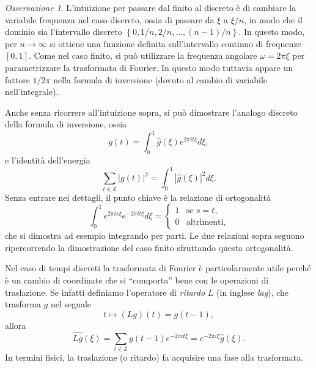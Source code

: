 \documentclass[
  italian,
  letterpaper,
]{book}
\newcommand{\cur}[1]{\left\{ #1 \right\}}
\theoremstyle{definition}
\theoremstyle{remark}
\newtheorem*{remark}{Osservazione}
\begin{document}
\begin{remark}
L'intuizione per passare dal finito al discreto è di cambiare la
variabile frequenza nel caso discreto, ossia di passare da \(\xi\) a
\(\xi/n\), in modo che il dominio sia l'intervallo discreto
\(\cur{0,1/n, 2/n, \ldots, (n-1)/n}\). In questo modo, per
\(n \to \infty\) si ottiene una funzione definita sull'intervallo
continuo di frequenze \([0,1]\). Come nel caso finito, si può utilizzare
la frequenza angolare \(\omega = 2 \pi \xi\) per parametrizzare la
trasformata di Fourier. In questo modo tuttavia appare un fattore
\(1/2\pi\) nella formula di inversione (dovuto al cambio di variabile
nell'integrale).
\end{remark}

Anche senza ricorrere all'intuizione sopra, si può dimostrare l'analogo
discreto della formula di inversione, ossia
\[ g(t) =  \int_0^1 \hat{g}(\xi) e^{2 \pi i t \xi}d \xi,\] e l'identità
dell'energia
\[ \sum_{t \in \mathbb{Z}} |g(t)|^2 =  \int_0^1 |\hat{g}(\xi)|^2 d \xi.\]
Senza entrare nei dettagli, il punto chiave è la relazione di
ortogonalità
\[ \int_0^1 e^{2 \pi i s \xi} e^{-2 \pi i t \xi} d \xi = \begin{cases} 1 & \text{se $s=t$,}
\\
0 & \text{altrimenti,}\end{cases}\] che si dimostra ad esempio
integrando per parti. Le due relazioni sopra seguono ripercorrendo la
dimostrazione del caso finito sfruttando questa ortogonalità.

Nel caso di tempi discreti la trasformata di Fourier è particolarmente
utile perché è un cambio di coordinate che si ``comporta'' bene con le
operazioni di traslazione. Se infatti definiamo l'operatore di
\emph{ritardo} \(L\) (in inglese \emph{lag}), che trasforma \(g\) nel
segnale \[ t \mapsto (Lg)(t) = g(t-1),\] allora
\[ \widehat{ Lg} (\xi) = \sum_{t \in \mathbb{Z}} g(t-1)e^{-2 \pi i t \xi} = e^{-2 \pi i \xi} \hat{g}(\xi).\]
In termini fisici, la traslazione (o ritardo) fa acquisire una fase alla
trasformata.
\end{document}
